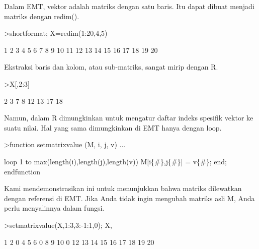 \documentclass[a4paper,10pt]{article}
\begin{document}
\begin{eulernotebook}
\begin{eulercomment}
\begin{eulercomment}
\begin{eulercomment}
\begin{eulercomment}
\begin{eulercomment}
Dalam EMT, vektor adalah matriks dengan satu baris. Itu dapat dibuat
menjadi matriks dengan redim().
\end{eulercomment}
\begin{eulerprompt}
>shortformat; X=redim(1:20,4,5)
\end{eulerprompt}
\begin{euleroutput}
          1         2         3         4         5 
          6         7         8         9        10 
         11        12        13        14        15 
         16        17        18        19        20 
\end{euleroutput}
\begin{eulercomment}
Ekstraksi baris dan kolom, atau sub-matriks, sangat mirip dengan R.
\end{eulercomment}
\begin{eulerprompt}
>X[,2:3]
\end{eulerprompt}
\begin{euleroutput}
          2         3 
          7         8 
         12        13 
         17        18 
\end{euleroutput}
\begin{eulercomment}
Namun, dalam R dimungkinkan untuk mengatur daftar indeks spesifik
vektor ke suatu nilai. Hal yang sama dimungkinkan di EMT hanya dengan
loop.
\end{eulercomment}
\begin{eulerprompt}
>function setmatrixvalue (M, i, j, v) ...
\end{eulerprompt}
\begin{eulerudf}
  loop 1 to max(length(i),length(j),length(v))
     M[i\{#\},j\{#\}] = v\{#\};
  end;
  endfunction
\end{eulerudf}
\begin{eulercomment}
Kami mendemonstrasikan ini untuk menunjukkan bahwa matriks dilewatkan
dengan referensi di EMT. Jika Anda tidak ingin mengubah matriks asli
M, Anda perlu menyalinnya dalam fungsi.
\end{eulercomment}
\begin{eulerprompt}
>setmatrixvalue(X,1:3,3:-1:1,0); X,
\end{eulerprompt}
\begin{euleroutput}
          1         2         0         4         5 
          6         0         8         9        10 
          0        12        13        14        15 
         16        17        18        19        20 
\end{euleroutput}
\begin{eulercomment}

\end{eulercomment}
\end{eulercomment}
\end{eulercomment}
\end{eulercomment}
\end{eulercomment}
\end{eulernotebook}
\end{document}
